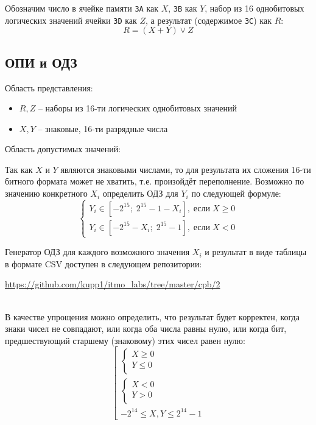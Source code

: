 \documentclass[11pt,a4paper]{article}
\begin{document}
Обозначим число в ячейке памяти \texttt{3A} как $X$, \texttt{3B} как $Y$, набор из 16 однобитовых логических значений ячейки \texttt{3D} как $Z$, а результат (содержимое \texttt{3С}) как $R$:
\begin{equation}
R = (X + Y) \lor Z
\end{equation}
\subsection{ОПИ и ОДЗ}
Область представления:
\begin{itemize}
	\item $R, Z$ -- наборы из 16-ти логических однобитовых значений
	\item $X, Y$ --	 знаковые, 16-ти разрядные числа
\end{itemize}

Область допустимых значений:

Так как $X$ и $Y$ являются знаковыми числами, то для результата их сложения 16-ти битного формата может не хватить, т.е. произойдёт переполнение. Возможно по значению конкретного $X_i$ определить ОДЗ для $Y_i$ по следующей формуле:
\begin{equation}
\begin{cases}
Y_i \in [-2^{15}; \;2^{15} - 1 - X_i], \; \text{если} \; X \geqslant 0\\
Y_i \in [-2^{15} - X_i;\; 2^{15} - 1], \; \text{если} \; X < 0
\end{cases}
\end{equation}

Генератор ОДЗ для каждого возможного значения $X_i$ и результат в виде таблицы в формате CSV доступен в следующем репозитории:\\
\begin{center}
\href{https://github.com/kupp1/itmo_labs/tree/master/cpb/2}{https://github.com/kupp1/itmo\_labs/tree/master/cpb/2}\\~\\
\end{center} 

В качестве упрощения можно определить, что результат будет корректен, когда знаки чисел не совпадают, или когда оба числа равны нулю, или когда бит, предшествующий старшему (знаковому) этих чисел  равен нулю:
\begin{equation}
\left[
\begin{gathered}
\begin{cases}
X \geqslant 0\\
Y\leqslant 0\\
\end{cases}\\
\begin{cases}
X < 0\\
Y> 0\\
\end{cases}\\
-2^{14} \leqslant X, Y \leqslant 2^{14} - 1
\end{gathered}
\right.
\end{equation}
\end{document}
